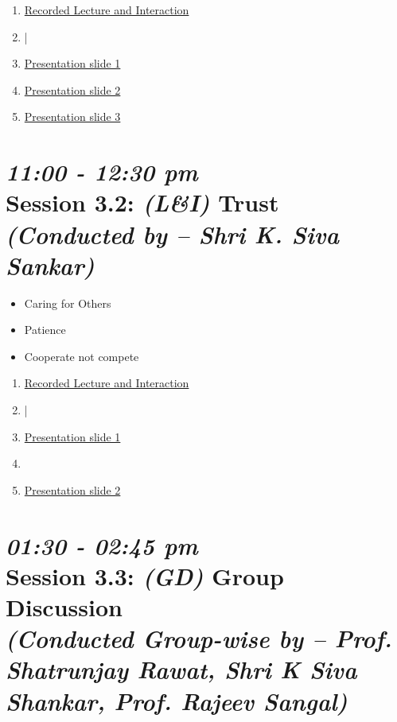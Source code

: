 \documentclass[11pt]{article}
\begin{document}
    \begin{enumerate}
        \item \href{https://www.youtube.com/watch?v=KAFbL6u7kps}{Recorded Lecture and Interaction}
        \item |
        \item \href{presentations/day3/relationships_in_family.pdf}{Presentation slide 1}
        \item \href{presentations/day3/other_feelings_in_relationships.pdf}{Presentation slide 2}
        \item \href{presentations/day3/gratitude.pdf}{Presentation slide 3}
    \end{enumerate}

    \section*{{\it 11:00 - 12:30 pm} \\
    Session 3.2: {\it (L\&I)} Trust \\
    {\Large\it (Conducted by -- Shri K. Siva Sankar)}}

    \begin{itemize}
        \item Caring for Others
        \item Patience
        \item Cooperate not compete
    \end{itemize}

    \begin{enumerate}
        \item \href{https://www.youtube.com/watch?v=9IMgZB6-Ru4}{Recorded Lecture and Interaction}
        \item |
        \item \href{presentations/day3/effection.pdf}{Presentation slide 1}
        \item \item \href{presentations/day3/trust.pdf}{Presentation slide 2}
    \end{enumerate}

    \section*{{\it 01:30 - 02:45 pm} \\
    Session 3.3: {\it (GD)} Group Discussion \\
    {\Large\it (Conducted Group-wise by -- Prof. Shatrunjay Rawat, Shri K Siva Shankar, Prof. Rajeev Sangal)}}
\end{document}
